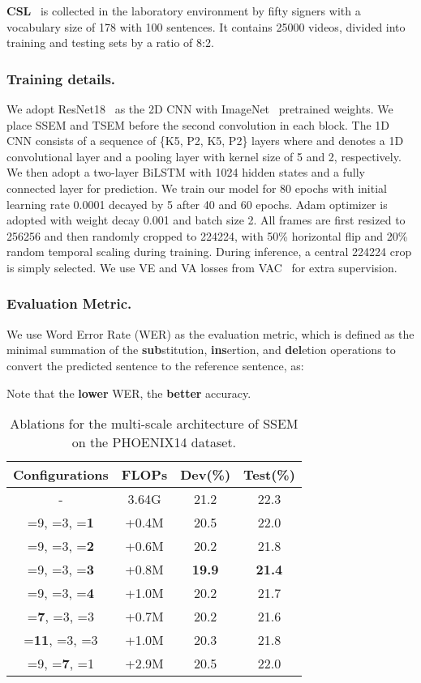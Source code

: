 \documentclass[letterpaper]{article} \usepackage{aaai23}  \usepackage{times}  \usepackage{helvet}  \usepackage{courier}  \usepackage[hyphens]{url}  \usepackage{graphicx} \urlstyle{rm} \def\UrlFont{\rm}  \usepackage{natbib}  \usepackage{caption} \frenchspacing  \setlength{\pdfpagewidth}{8.5in} \setlength{\pdfpageheight}{11in} \usepackage{algorithm}
\begin{document}
\textbf{CSL}~\cite{huang2018video} is collected in the laboratory environment by fifty signers with a vocabulary size of 178 with 100 sentences. It contains 25000 videos, divided into training and testing sets by a ratio of 8:2.

\subsubsection{Training details.} We adopt ResNet18~\cite{he2016deep} as the 2D CNN with ImageNet~\cite{deng2009imagenet} pretrained weights. We place SSEM and TSEM before the second convolution in each block. The 1D CNN consists of a sequence of \{K5, P2, K5, P2\} layers where  and  denotes a 1D convolutional layer and a pooling layer with kernel size of 5 and 2, respectively. We then adopt a two-layer BiLSTM with 1024 hidden states and a fully connected layer for prediction. We train our model for 80 epochs with initial learning rate 0.0001 decayed by 5 after 40 and 60 epochs. Adam optimizer is adopted with weight decay 0.001 and batch size 2. All frames are first resized to 256256 and then randomly cropped to 224224, with 50\% horizontal flip and 20\% random temporal scaling during training. During inference, a central 224224 crop is simply selected. We use VE and VA losses from VAC~\cite{Min_2021_ICCV} for extra supervision. 

\subsubsection{Evaluation Metric.} We use Word Error Rate (WER) as the evaluation metric, which is defined as the minimal summation of the \textbf{sub}stitution, \textbf{ins}ertion, and \textbf{del}etion operations to convert the predicted sentence to the reference sentence, as:

Note that the \textbf{lower} WER, the \textbf{better} accuracy.


\begin{table}[t]   
  \centering
  \begin{tabular}{cccc}
  \hline
  Configurations & FLOPs & Dev(\%) & Test(\%)\\
  \hline
  - & 3.64G& 21.2 & 22.3\\
  =9, =3, =\textbf{1} & +0.4M  & 20.5  & 22.0 \\
  =9, =3, =\textbf{2} & +0.6M& 20.2 & 21.8 \\
  =9, =3, =\textbf{3} & +0.8M & \textbf{19.9}  & \textbf{21.4} \\
  =9, =3, =\textbf{4} & +1.0M & 20.2  & 21.7 \\
  =\textbf{7}, =3, =3 & +0.7M & 20.2  & 21.6 \\
  =\textbf{11}, =3, =3 & +1.0M & 20.3  & 21.8 \\
  =9, =\textbf{7}, =1 & +2.9M & 20.5 & 22.0 \\
  \hline
  \end{tabular}
  \caption{Ablations for the multi-scale architecture of SSEM on the PHOENIX14 dataset.} 
  \label{tab1} 
  \end{table}
\end{document}

